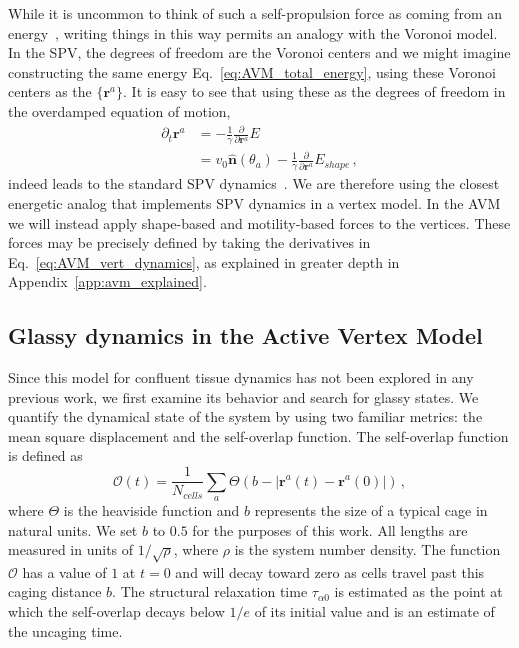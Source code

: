 \documentclass[
reprint
,aps
,amssymb
,amsmath
,superscriptaddress
]{revtex4-1}
\begin{document}
While it is uncommon to think of such a self-propulsion force as coming from an energy~\cite{sknepnek2015active}, writing things in this way permits an analogy with the Voronoi model. In the SPV, the degrees of freedom are the Voronoi centers and we might imagine constructing the same energy Eq.~\ref{eq:AVM_total_energy}, using these Voronoi centers as the $\{\mathbf{r}^a\}$. It is easy to see that using these as the degrees of freedom in the overdamped equation of motion,
%
\begin{equation}
\begin{aligned}\label{eq:AVM_voronoi_dof}
\partial_t \mathbf{r}^a & = -\frac{1}{\gamma} \frac{\partial}{\partial\mathbf{r}^a} E \\ &= v_0 \mathbf{\hat{n}}(\theta_a) -\frac{1}{\gamma} \frac{\partial}{\partial\mathbf{r}^a} E_{shape} \, ,
\end{aligned}
\end{equation}
%
indeed leads to the standard SPV dynamics~\cite{Bi2016,Yang2017,Barton2017}. We are therefore using the closest energetic analog that implements SPV dynamics in a vertex model. In the AVM we will instead apply shape-based and motility-based forces to the vertices. These forces may be precisely defined by taking the derivatives in Eq.~\ref{eq:AVM_vert_dynamics}, as explained in greater depth in Appendix~\ref{app:avm_explained}.



\subsection{Glassy dynamics in the Active Vertex Model \label{sec:AVM_rheology}}
Since this model for confluent tissue dynamics has not been explored in any previous work, we first examine its behavior and search for glassy states. We quantify the dynamical state of the system by using two familiar metrics: the mean square displacement and the self-overlap function. The self-overlap function is defined as
%
\begin{equation}\label{eq:overlap_definition}
\mathcal{O}(t) = \frac{1}{N_{cells}} \sum_{a} \Theta\left( b-| \mathbf{r}^a(t) -\mathbf{r}^a(0)|\right)  \, ,
\end{equation}
%
where $\Theta$ is the heaviside function and $b$ represents the size of a typical cage in natural units. We set $b$ to $0.5$ for the purposes of this work. All lengths are measured in units of $1/\sqrt{\rho}$, where $\rho$ is the system number density. The function $\mathcal{O}$ has a value of $1$ at $t=0$ and will decay toward zero as cells travel past this caging distance $b$. The structural relaxation time $\tau_{\alpha0}$ is estimated as the point at which the self-overlap decays below $1/e$ of its initial value and is an estimate of the uncaging time.
\end{document}
